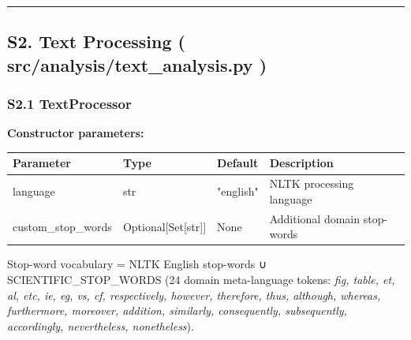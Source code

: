 \documentclass[
]{article}
\newcounter{none} %
\numberwithin{equation}{section}
\renewcommand{\texttt}[1]{%
    \colorbox{codebg}{\color{codefg}\ttfamily #1}%
}
\begin{document}
\begin{center}\rule{0.5\linewidth}{0.5pt}\end{center}

\subsection{\texorpdfstring{S2. Text Processing
(\texttt{src/analysis/text\_analysis.py})}{S2. Text Processing (src/analysis/text\_analysis.py)}}\label{s2.-text-processing-srcanalysistext_analysis.py}

\subsubsection{\texorpdfstring{S2.1
\texttt{TextProcessor}}{S2.1 TextProcessor}}\label{s2.1-textprocessor}

\textbf{Constructor parameters:}

{\def\LTcaptype{none} %
\begin{longtable}[]{@{}
  >{\raggedright\arraybackslash}p{}
  >{\raggedright\arraybackslash}p{}
  >{\raggedright\arraybackslash}p{}
  >{\raggedright\arraybackslash}p{}@{}}
\toprule\noalign{}
\begin{minipage}[b]{\linewidth}\raggedright
Parameter
\end{minipage} & \begin{minipage}[b]{\linewidth}\raggedright
Type
\end{minipage} & \begin{minipage}[b]{\linewidth}\raggedright
Default
\end{minipage} & \begin{minipage}[b]{\linewidth}\raggedright
Description
\end{minipage} \\
\midrule\noalign{}
\endhead
\bottomrule\noalign{}
\endlastfoot
\texttt{language} & \texttt{str} & \texttt{"english"} & NLTK processing
language \\
\texttt{custom\_stop\_words} & \texttt{Optional{[}Set{[}str{]}{]}} &
\texttt{None} & Additional domain stop-words \\
\end{longtable}
}

Stop-word vocabulary = NLTK English stop-words ∪
\texttt{SCIENTIFIC\_STOP\_WORDS} (24 domain meta-language tokens:
\emph{fig, table, et, al, etc, ie, eg, vs, cf, respectively, however,
therefore, thus, although, whereas, furthermore, moreover, addition,
similarly, consequently, subsequently, accordingly, nevertheless,
nonetheless}).
\end{document}

